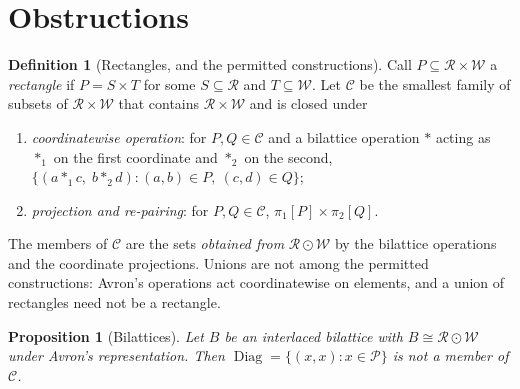 \documentclass[11pt,reqno]{amsart}
\theoremstyle{plain}
\newtheorem{proposition}[theorem]{Proposition}
\theoremstyle{definition}
\newtheorem{definition}[theorem]{Definition}
\theoremstyle{remark}
\newcommand{\Pos}{\mathcal{P}}
\begin{document}
\section{Obstructions}\label{sec:obstructions}

\begin{definition}[Rectangles, and the permitted constructions]\label{def:rect}
Call $P \subseteq \mathcal{R} \times \mathcal{W}$ a \emph{rectangle} if
$P = S \times T$ for some $S \subseteq \mathcal{R}$ and
$T \subseteq \mathcal{W}$. Let $\mathcal{C}$ be the smallest family of subsets
of $\mathcal{R} \times \mathcal{W}$ that contains $\mathcal{R} \times
\mathcal{W}$ and is closed under
\begin{enumerate}
  \item[(i)] \emph{coordinatewise operation}: for $P, Q \in \mathcal{C}$ and a
    bilattice operation $\ast$ acting as $\ast_{1}$ on the first coordinate and
    $\ast_{2}$ on the second,
    $\{(a \ast_{1} c,\; b \ast_{2} d) : (a,b) \in P,\ (c,d) \in Q\}$;
  \item[(ii)] \emph{projection and re-pairing}: for $P, Q \in \mathcal{C}$,
    $\pi_{1}[P] \times \pi_{2}[Q]$.
\end{enumerate}
The members of $\mathcal{C}$ are the sets \emph{obtained from} $\mathcal{R}
\odot \mathcal{W}$ by the bilattice operations and the coordinate projections.
Unions are not among the permitted constructions: Avron's operations act
coordinatewise on elements, and a union of rectangles need not be a rectangle.
\end{definition}

\begin{proposition}[Bilattices]\label{thm:bilattice}
Let $B$ be an interlaced bilattice with $B \cong \mathcal{R} \odot \mathcal{W}$
under Avron's representation. Then $\operatorname{Diag} = \{(x,x) : x \in \Pos\}$
is not a member of $\mathcal{C}$.
\end{proposition}
\end{document}
